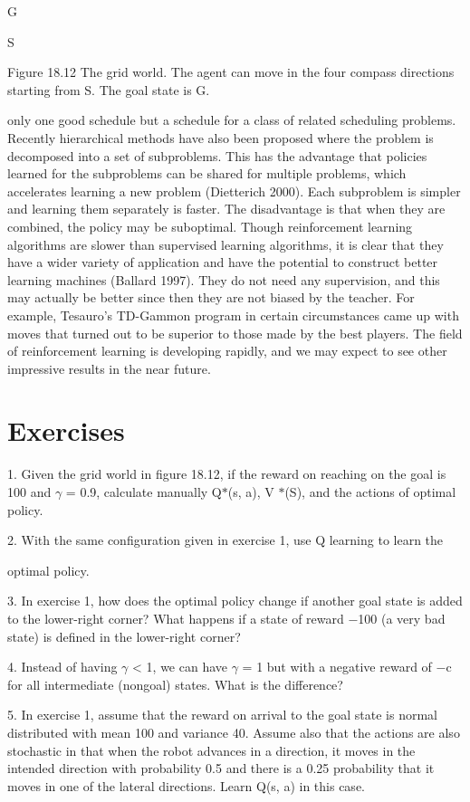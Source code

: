 G

S

Figure 18.12 The grid world. The agent can move in the four compass directions starting from S. The goal state is G.

only one good schedule but a schedule for a class of related scheduling problems. Recently hierarchical methods have also been proposed where the problem is decomposed into a set of subproblems. This has the advantage that policies learned for the subproblems can be shared for multiple problems, which accelerates learning a new problem (Dietterich 2000). Each subproblem is simpler and learning them separately is faster. The disadvantage is that when they are combined, the policy may be suboptimal. Though reinforcement learning algorithms are slower than supervised learning algorithms, it is clear that they have a wider variety of application and have the potential to construct better learning machines (Ballard 1997). They do not need any supervision, and this may actually be better since then they are not biased by the teacher. For example, Tesauro’s TD-Gammon program in certain circumstances came up with moves that turned out to be superior to those made by the best players. The field of reinforcement learning is developing rapidly, and we may expect to see other impressive results in the near future.

\section{Exercises}

1. Given the grid world in figure 18.12, if the reward on reaching on the goal is 100 and $\gamma$ = 0.9, calculate manually Q$*$(s, a), V $*$(S), and the actions of optimal policy.

2. With the same configuration given in exercise 1, use Q learning to learn the

optimal policy.

3. In exercise 1, how does the optimal policy change if another goal state is added to the lower-right corner? What happens if a state of reward $-$100 (a very bad state) is defined in the lower-right corner?

4. Instead of having $\gamma$ < 1, we can have $\gamma$ = 1 but with a negative reward of $-$c for all intermediate (nongoal) states. What is the difference?

5. In exercise 1, assume that the reward on arrival to the goal state is normal distributed with mean 100 and variance 40. Assume also that the actions are also stochastic in that when the robot advances in a direction, it moves in the intended direction with probability 0.5 and there is a 0.25 probability that it moves in one of the lateral directions. Learn Q(s, a) in this case.

